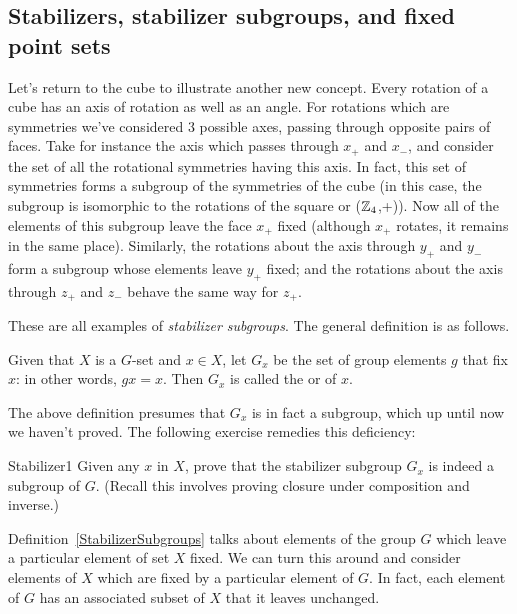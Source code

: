 \subsection{Stabilizers, stabilizer subgroups, and fixed point sets}

 Let's return to the cube to illustrate another new concept. Every rotation of a cube has an axis of rotation as well as an angle.   
 For rotations which are symmetries we've considered 3 possible axes, passing through opposite pairs of faces. 
Take for instance the axis which passes through $x_+$ and $x_-$, and consider the set of all the rotational symmetries having this axis.
In fact, this set of symmetries forms a subgroup  of the symmetries of the cube (in this case, the subgroup is isomorphic to the rotations of the square or ($\mathbb{Z}_4$,+)). Now all of the elements of this subgroup leave the face  $x_+$ fixed (although $x_+$ rotates, it remains in the same place).
Similarly, the rotations about the axis through $y_+$ and $y_-$ form a subgroup whose elements leave  $y_+$ fixed; and the rotations about the axis through $z_+$ and $z_-$ behave the same way for $z_+$.  

 These are all examples of \emph{stabilizer subgroups}. The general definition is as follows.

\begin{defn}\label{StabilizerSubgroups} 
Given that $X$ is a $G$-set and  $x \in X$, let $G_x$ be the set of  group elements $g$ that fix $x$:  in other words, $gx=x$.  Then $G_x$ is called the  or  of $x$.
\end{defn}

The above definition presumes that $G_x$ is in fact a subgroup, which up until now we haven't proved. The following exercise remedies this deficiency:

\begin{exercise}{Stabilizer1}
Given any $x$ in $X$, prove that the stabilizer subgroup $G_x$  is indeed a subgroup of $G$.  (Recall this involves proving closure under composition and inverse.)
\end {exercise}

Definition~\ref{StabilizerSubgroups} talks about elements of the group $G$ which leave a particular element of set $X$ fixed. We can turn this around and consider elements of $X$ which are fixed by a particular element of $G$. In fact, each element of $G$ has an associated subset of $X$ that it leaves unchanged. 

